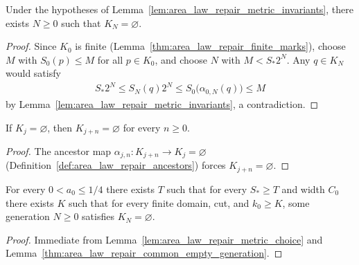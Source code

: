 \begin{lemma}
    \label{thm:area_law_repair_common_empty_generation}
    \leanok
    Under the hypotheses of Lemma~\ref{lem:area_law_repair_metric_invariants}, there exists
    $N\ge0$ such that $K_N=\varnothing$.
\end{lemma}
\begin{proof}\leanok
    Since $K_0$ is finite (Lemma~\ref{thm:area_law_repair_finite_marks}), choose $M$ with
    $S_0(p)\le M$ for all $p\in K_0$, and choose $N$ with $M<S_*2^N$. Any $q\in K_N$ would satisfy
    \begin{align}
        S_*2^N\le S_N(q)2^N
        \le S_0\bigl(\alpha_{0,N}(q)\bigr)\le M
        \label{eq:area_law_repair_common_empty_contradiction}
    \end{align}
    by Lemma~\ref{lem:area_law_repair_metric_invariants}, a contradiction.
\end{proof}

\begin{lemma}
    \label{thm:area_law_repair_empty_persistence}
    \leanok
    If $K_j=\varnothing$, then $K_{j+n}=\varnothing$ for every $n\ge0$.
\end{lemma}
\begin{proof}\leanok
    The ancestor map $\alpha_{j,n}:K_{j+n}\to K_j=\varnothing$ (Definition~\ref{def:area_law_repair_ancestors})
    forces $K_{j+n}=\varnothing$.
\end{proof}

\begin{lemma}
    \label{thm:area_law_repair_uniform_empty_thresholds}
    \leanok
    For every $0<a_0\le1/4$ there exists $T$ such that for every $S_*\ge T$ and width $C_0$
    there exists $K$ such that for every finite domain, cut, and $k_0\ge K$, some generation
    $N\ge0$ satisfies $K_N=\varnothing$.
\end{lemma}
\begin{proof}\leanok
    Immediate from Lemma~\ref{lem:area_law_repair_metric_choice} and
    Lemma~\ref{thm:area_law_repair_common_empty_generation}.
\end{proof}
